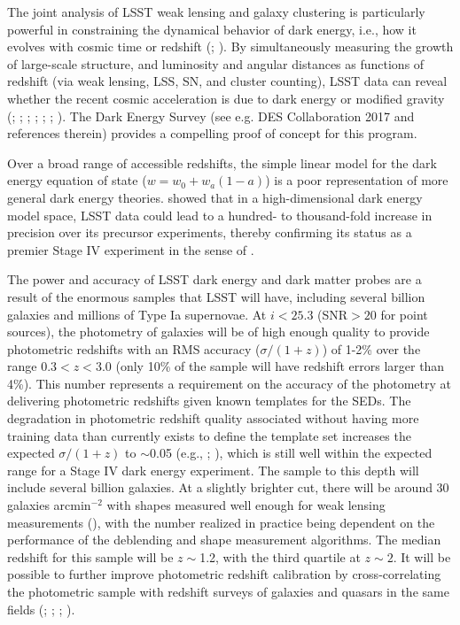 The joint analysis of LSST weak lensing and galaxy clustering is
particularly powerful in constraining the dynamical behavior of dark
energy, i.e., how it evolves with cosmic time or redshift (\cite{2004PhRvD..70D3009H}; \cite{2006JCAP...08..008Z}).  By
simultaneously measuring the growth of large-scale structure, and
luminosity and angular distances as functions of redshift (via weak
lensing, LSS, SN, and cluster counting), LSST data can reveal whether
the recent cosmic acceleration is due to dark energy or modified
gravity (\cite{2004PhRvD..69D4005L}; \cite{2006PhRvD..74B3512K};
\cite{2006PhRvD..74d3513I}; \cite{2008PhRvD..78f3503J}; \cite{2011PhRvD..83b3008O};
\cite{2013ApJ...779...39J}; \cite{Weinberg2013}). The Dark Energy Survey (see e.g. DES Collaboration 2017 \cite{2017arXiv170801530D} and references therein) provides a compelling proof of concept for this program.

Over a broad range of accessible redshifts, the simple linear model
for the dark energy equation of state ($w = w_0 + w_a(1-a)$) is a poor representation of more
general dark energy theories. \cite{2008PhRvD..78d3528B} showed that in a high-dimensional dark energy model space,
LSST data could lead to a hundred- to thousand-fold increase in precision over its
precursor experiments, thereby confirming its status as
a premier Stage IV experiment in the sense of \cite{2006astro.ph..9591A}.

The power and accuracy of LSST dark energy and dark matter probes are
a result of the enormous samples that LSST will have, including
several billion galaxies and millions of Type Ia
supernovae. At $i < 25.3$ (SNR${}>20$ for point sources), the
photometry of galaxies will be of high enough quality to provide
photometric redshifts with an RMS accuracy ($\sigma/(1+z)$) of 1-2\%
over the range $0.3 < z < 3.0$ (only
10\% of the sample will have redshift errors larger than 4\%).
This number represents a requirement on the accuracy of the photometry at delivering photometric
redshifts given known templates for the SEDs.  The degradation in photometric redshift quality associated without having more
training data than currently exists to define the template set increases the
expected $\sigma/(1+z)$ to $\sim$0.05 (e.g., \cite{2015APh....63...81N}; \cite{2017arXiv170609507G}), which is still well within the
expected range for a Stage IV dark energy experiment.  The
sample to this depth will include several billion galaxies.  At a
slightly brighter cut, there will be around 30 galaxies arcmin$^{-2}$
with shapes measured well enough for weak lensing measurements (\cite{2013MNRAS.434.2121C,2015MNRAS.447.1746C}),
with the number realized in practice being dependent on
the performance of the deblending and shape measurement algorithms.
The median redshift for
this sample will be $z\sim$1.2, with the third quartile at $z\sim2$.
It will be possible to further improve photometric redshift calibration
by cross-correlating the photometric sample with redshift surveys of
galaxies and quasars in the same fields (\cite{2008ApJ...684...88N}; \cite{2010ApJ...721..456M};
\cite{2013arXiv1303.4722M}; \cite{2017arXiv171002517D}).


